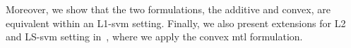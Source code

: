 Moreover, we show that the two formulations, the {additive} and {convex}, are equivalent within an L1-\acrshort{svm} setting.
%
Finally, we also present extensions for L2 and LS-\acrshort{svm} setting in~\cite{RuizAD21}, where we apply the convex \acrshort{mtl} formulation.


